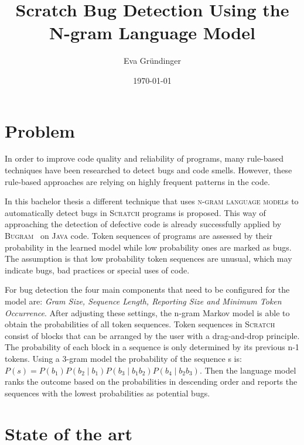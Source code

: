 \documentclass[
    numbers=noenddot,
    parskip=half-,
    fontsize=12pt,
    paper=a4,
    oneside,
    titlepage,
    bibliography=totoc,
    chapterprefix=false,
]{scrbook}
\title{Scratch Bug Detection Using the N-gram Language Model}
\author{Eva Gründinger}
\date{\today}
\newcommand{\ngram}{\textsc{n-gram language model}}
\newcommand{\bugram}{\textsc{Bugram}}
\newcommand{\scratch}{\textsc{Scratch}}
\newcommand{\java}{\textsc{Java}}
\begin{document}

    \frontmatter
    
    \tableofcontents
    \newpage


    \mainmatter

    \chapter{Problem}\label{ch:problem}
    In order to improve code quality and reliability of programs, many rule-based techniques have been researched to detect bugs and code smells. However, these rule-based approaches are relying on highly frequent patterns in the code. 
    
    In this bachelor thesis a different technique that uses \ngram{s} to automatically detect bugs in \scratch{} programs is proposed. This way of approaching the detection of defective code is already successfully applied by \bugram{}~\cite{bugram} on \java{} code. Token sequences of programs are assessed by their probability in the learned model while low probability ones are marked as bugs. The assumption is that low probability token sequences are unusual, which may indicate bugs, bad practices or special uses of code. 
    
    For bug detection the four main components that need to be configured for the model are: \textit{Gram Size, Sequence Length, Reporting Size and Minimum Token Occurrence}. After adjusting these settings, the n-gram Markov model is able to obtain the probabilities of all token sequences. Token sequences in \scratch{} consist of blocks that can be arranged by the user with a drag-and-drop principle. The probability of each block in a sequence is only determined by its previous n-1 tokens. Using a 3-gram model the probability of the sequence s is:
    \(P(s) = P(b_{1})P(b_{2}\mid b_{1})P(b_{3}\mid b_{1}b_{2})P(b_{4}\mid b_{2}b_{3}) \). Then the language model ranks the outcome based on the probabilities in descending order and reports the sequences with the lowest probabilities as potential bugs. 
    

    \chapter{State of the art}\label{ch:state-of-the-art}
    
\end{document}

